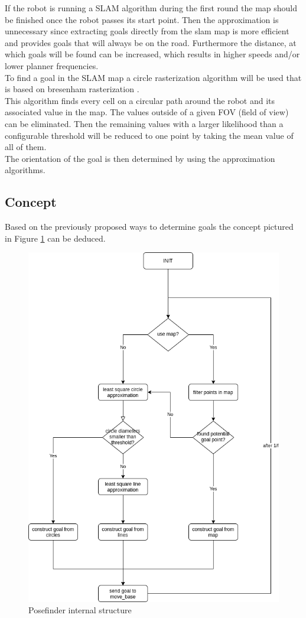 If the robot is running a SLAM algorithm during the first round the map should be finished once the robot passes its start point. Then the approximation is unnecessary since extracting goals directly from the slam map is more efficient and provides goals that will  always be on the road. Furthermore the distance, at which goals will be found can be increased, which results in higher speeds and/or lower planner frequencies.\\

To find a goal in the SLAM map a circle rasterization algorithm will be used that is based on bresenham rasterization \cite{ComputerGraphics}.\\

This algorithm finds every cell on a circular path around the robot and its associated value in the map. The values outside of a given FOV (field of view) can be eliminated. Then the remaining values with a larger likelihood than a configurable threshold will be reduced to one point by taking the mean value of all of them.\\

The orientation of the goal is then determined by using the approximation algorithms.

\subsection{Concept}

Based on the previously proposed ways to determine goals the concept pictured in Figure \ref{posefinder structure} can be deduced.\\

\begin{figure}[H]
	\centering
	\includegraphics[width=.5\textwidth]{Pictures/posefinder diagram}
	\caption{Posefinder internal structure}
	\label{posefinder structure}
\end{figure}

